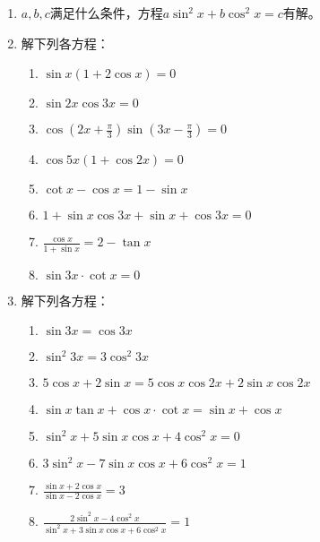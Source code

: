 \begin{enumerate}
\item $a,b,c$满足什么条件，方程$a\sin^2 x+b\cos^2 x=c$有解。

\item 解下列各方程：
   \begin{enumerate}
\item $\sin x(1+2 \cos x)=0$
\item  $\sin 2 x \cos 3 x=0$
\item  $\cos \left(2 x+\frac{\pi}{3}\right) \sin \left(3 x-\frac{\pi}{3}\right)=0$
\item  $\cos 5 x(1+\cos 2 x)=0$
\item $\cot x-\cos x=1-\sin x$
\item  $1+\sin x \cos 3 x+\sin x+\cos 3 x=0$
\item $\frac{\cos x}{1+\sin x}=2-\tan x$
\item $\sin 3 x \cdot \cot x=0$
\end{enumerate} 

\item 解下列各方程：
\begin{enumerate}
 \item  $\sin 3 x=\cos 3 x$
\item  $\sin ^{2} 3 x=3 \cos ^{2} 3 x$
\item $ 5 \cos x+2 \sin x=5 \cos x \cos 2 x+2 \sin x \cos 2 x$   
\item $\sin x \tan x+\cos x \cdot \cot x=\sin x+\cos x$
\item $\sin ^{2} x+5 \sin x \cos x+4 \cos ^{2} x=0$
\item $3 \sin ^{2} x-7 \sin x \cos x+6 \cos ^{2} x=1$
\item $\frac{\sin x+2 \cos x}{\sin x-2 \cos x}=3$
\item  $\frac{2 \sin ^{2} x-4 \cos ^{2} x}{\sin ^{2} x+3 \sin x \cos x+6 \cos ^{2} x}=1$
\end{enumerate}


\end{enumerate}
